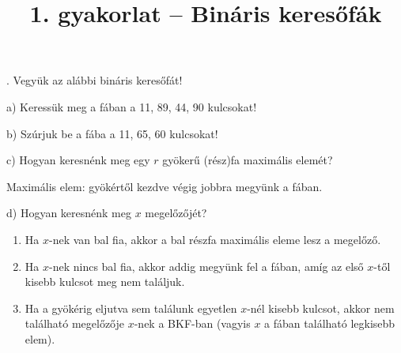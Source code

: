 \documentclass[12pt]{article}
\date{}
\title{1. gyakorlat -- Bináris keresőfák}
\begin{document}
\maketitle

. Vegyük az alábbi bináris keresőfát!

\begin{figure}[!h]
\centering
\end{figure}

\noindent a) Keressük meg a fában a 11, 89, 44, 90 kulcsokat!

\noindent b) Szúrjuk be a fába a 11, 65, 60 kulcsokat!

\begin{figure}[!h]
\centering
\end{figure}

\noindent c) Hogyan keresnénk meg egy $r$ gyökerű (rész)fa maximális elemét?

Maximális elem: gyökértől kezdve végig jobbra megyünk a fában.

\noindent d) Hogyan keresnénk meg $x$ megelőzőjét?

\begin{enumerate}
\item Ha $x$-nek van bal fia, akkor a bal részfa maximális eleme lesz a megelőző.
\item Ha $x$-nek nincs bal fia, akkor addig megyünk fel a fában, amíg az első $x$-től kisebb kulcsot meg nem találjuk.
\item Ha a gyökérig eljutva sem találunk egyetlen $x$-nél kisebb kulcsot, akkor nem található megelőzője $x$-nek a BKF-ban (vagyis $x$ a fában található legkisebb elem).
\end{enumerate}
\end{document}

